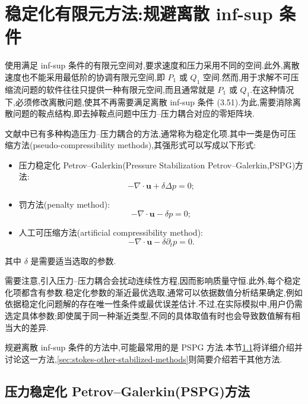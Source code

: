 \section{稳定化有限元方法:规避离散 inf-sup 条件}
\label{sec:stokes-stabilized-fem}

\begin{note}[动机]\label{note:stokes-stabilization-motivation}
使用满足 inf-sup 条件的有限元空间对,要求速度和压力采用不同的空间.此外,离散速度也不能采用最低阶的协调有限元空间,即 $P_1$ 或 $Q_1$ 空间.然而,用于求解不可压缩流问题的软件往往只提供一种有限元空间,而且通常就是 $P_1$ 或 $Q_1$.在这种情况下,必须修改离散问题,使其不再需要满足离散 inf-sup 条件 (3.51).为此,需要消除离散问题的鞍点结构,即去掉鞍点问题中压力--压力耦合对应的零矩阵块.

文献中已有多种构造压力--压力耦合的方法,通常称为稳定化项.其中一类是伪可压缩方法(pseudo-compressibility methods),其强形式可以写成以下形式:
\begin{itemize}
  \item 压力稳定化 Petrov--Galerkin(Pressure Stabilization Petrov--Galerkin,PSPG)方法:
  \[
    -\nabla\cdot\bm{u}+\delta\Delta p=0;
  \]
  \item 罚方法(penalty method):
  \[
    -\nabla\cdot\bm{u}-\delta p=0;
  \]
  \item 人工可压缩方法(artificial compressibility method):
  \[
    -\nabla\cdot\bm{u}-\delta\partial_t p=0.
  \]
\end{itemize}
其中 $\delta$ 是需要适当选取的参数.

需要注意,引入压力--压力耦合会扰动连续性方程,因而影响质量守恒.此外,每个稳定化项都含有参数.稳定化参数的渐近最优选取,通常可以依据数值分析结果确定,例如依据稳定化问题解的存在唯一性条件或最优误差估计.不过,在实际模拟中,用户仍需选定具体参数;即使属于同一种渐近类型,不同的具体取值有时也会导致数值解有相当大的差异.
\end{note}

\begin{note}[本节内容]\label{note:stokes-stabilization-section-overview}
规避离散 inf-sup 条件的方法中,可能最常用的是 PSPG 方法.本节\cref{sec:stokes-pspg}将详细介绍并讨论这一方法,\cref{sec:stokes-other-stabilized-methods}则简要介绍若干其他方法.
\end{note}

\subsection{压力稳定化 Petrov--Galerkin(PSPG)方法}
\label{sec:stokes-pspg}

